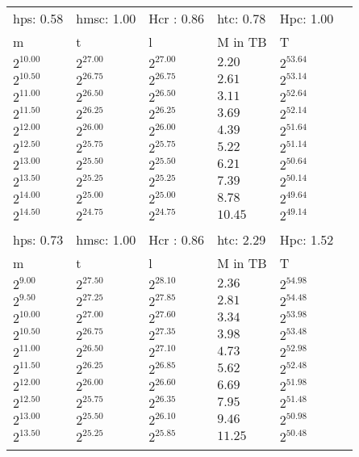 \begin{tabular}{llllll}
hps: 0.58 & hmsc: 1.00 & Hcr : 0.86 & htc: 0.78 & Hpc: 1.00 &  \\
m & t & l & M in TB & T \\
$2^{10.00}$ & $2^{27.00}$ & $2^{27.00}$ & $2.20$ & $2^{53.64}$ \\
$2^{10.50}$ & $2^{26.75}$ & $2^{26.75}$ & $2.61$ & $2^{53.14}$ \\
$2^{11.00}$ & $2^{26.50}$ & $2^{26.50}$ & $3.11$ & $2^{52.64}$ \\
$2^{11.50}$ & $2^{26.25}$ & $2^{26.25}$ & $3.69$ & $2^{52.14}$ \\
$2^{12.00}$ & $2^{26.00}$ & $2^{26.00}$ & $4.39$ & $2^{51.64}$ \\
$2^{12.50}$ & $2^{25.75}$ & $2^{25.75}$ & $5.22$ & $2^{51.14}$ \\
$2^{13.00}$ & $2^{25.50}$ & $2^{25.50}$ & $6.21$ & $2^{50.64}$ \\
$2^{13.50}$ & $2^{25.25}$ & $2^{25.25}$ & $7.39$ & $2^{50.14}$ \\
$2^{14.00}$ & $2^{25.00}$ & $2^{25.00}$ & $8.78$ & $2^{49.64}$ \\
$2^{14.50}$ & $2^{24.75}$ & $2^{24.75}$ & $10.45$ & $2^{49.14}$ \\
 &  &  &  &  &  \\
hps: 0.73 & hmsc: 1.00 & Hcr : 0.86 & htc: 2.29 & Hpc: 1.52 &  \\
m & t & l & M in TB & T \\
$2^{9.00}$ & $2^{27.50}$ & $2^{28.10}$ & $2.36$ & $2^{54.98}$ \\
$2^{9.50}$ & $2^{27.25}$ & $2^{27.85}$ & $2.81$ & $2^{54.48}$ \\
$2^{10.00}$ & $2^{27.00}$ & $2^{27.60}$ & $3.34$ & $2^{53.98}$ \\
$2^{10.50}$ & $2^{26.75}$ & $2^{27.35}$ & $3.98$ & $2^{53.48}$ \\
$2^{11.00}$ & $2^{26.50}$ & $2^{27.10}$ & $4.73$ & $2^{52.98}$ \\
$2^{11.50}$ & $2^{26.25}$ & $2^{26.85}$ & $5.62$ & $2^{52.48}$ \\
$2^{12.00}$ & $2^{26.00}$ & $2^{26.60}$ & $6.69$ & $2^{51.98}$ \\
$2^{12.50}$ & $2^{25.75}$ & $2^{26.35}$ & $7.95$ & $2^{51.48}$ \\
$2^{13.00}$ & $2^{25.50}$ & $2^{26.10}$ & $9.46$ & $2^{50.98}$ \\
$2^{13.50}$ & $2^{25.25}$ & $2^{25.85}$ & $11.25$ & $2^{50.48}$ \\
 &  &  &  &  &  \\

\end{tabular}
